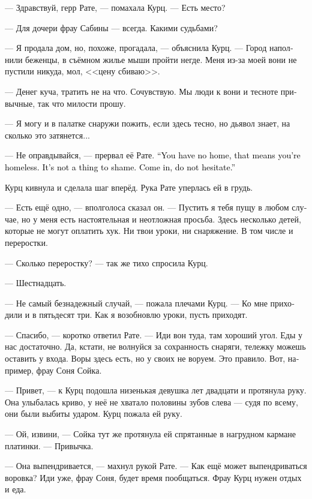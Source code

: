 \documentclass[a4paper,12pt,fleqn]{book}\usepackage{cooltooltips}\usepackage{polyglossia}\setdefaultlanguage[babelshorthands=true]{russian}\setotherlanguage{english}\defaultfontfeatures{Ligatures=TeX,Mapping=tex-text} \usepackage{xcolor}\definecolor{lightgray}{HTML}{bbbbbb}\color{lightgray}\newcommand{\ml}[3]{\textenglish{\textcolor{black}{#3}}}
\begin{document}
--- Здравствуй, герр Рате, --- помахала Курц.
--- Есть место?

--- Для дочери фрау Сабины --- всегда.
Какими судьбами?

--- Я продала дом, но, похоже, прогадала, --- объяснила Курц.
--- Город наполнили беженцы, в съёмном жилье мыши пройти негде.
Меня из-за моей вони не пустили никуда, мол, <<цену сбиваю>>.

--- Денег куча, тратить не на что.
Сочувствую.
Мы люди к вони и тесноте привычные, так что милости прошу.

--- Я могу и в палатке снаружи пожить, если здесь тесно, но дьявол знает, на сколько это затянется...

--- Не оправдывайся, --- прервал её Рате.
\ml{$0$}
{--- Без дома --- значит, без дома.}
{``You have no home, that means you're homeless.}
\ml{$0$}
{Ничего зазорного в этом нет.}
{It's not a thing to shame.}
\ml{$0$}
{Проходи и не думай.}
{Come in, do not hesitate.''}

Курц кивнула и сделала шаг вперёд.
Рука Рате уперлась ей в грудь.

--- Есть ещё одно, --- вполголоса сказал он.
--- Пустить я тебя пущу в любом случае, но у меня есть настоятельная и неотложная просьба.
Здесь несколько детей, которые не могут оплатить хук.
Ни твои уроки, ни снаряжение.
В том числе и переростки.

--- Сколько переростку? --- так же тихо спросила Курц.

--- Шестнадцать.

--- Не самый безнадежный случай, --- пожала плечами Курц.
--- Ко мне приходили и в пятьдесят три.
Как я возобновлю уроки, пусть приходят.

--- Спасибо, --- коротко ответил Рате.
--- Иди вон туда, там хороший угол.
Еды у нас достаточно.
Да, кстати, не волнуйся за сохранность снаряги, тележку можешь оставить у входа.
Воры здесь есть, но у своих не воруем.
Это правило.
Вот, например, фрау Соня Сойка.

--- Привет, --- к Курц подошла низенькая девушка лет двадцати и протянула руку.
Она улыбалась криво, у неё не хватало половины зубов слева --- судя по всему, они были выбиты ударом.
Курц пожала ей руку.

--- Ой, извини, --- Сойка тут же протянула ей спрятанные в нагрудном кармане платинки.
--- Привычка.

--- Она выпендривается, --- махнул рукой Рате.
--- Как ещё может выпендриваться воровка?
Иди уже, фрау Соня, будет время пообщаться.
Фрау Курц нужен отдых и еда.
\end{document}
